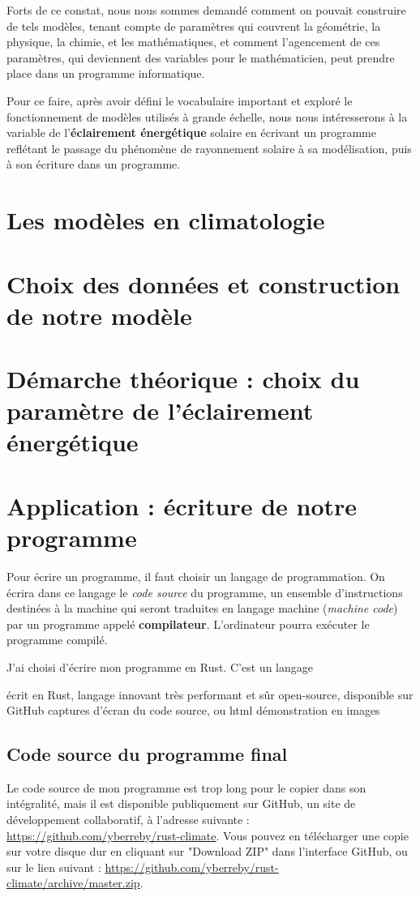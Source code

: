 \documentclass[12pt]{article}
\begin{document}
Forts de ce constat, nous nous sommes demandé comment on pouvait construire de tels modèles, tenant compte de paramètres qui couvrent la géométrie, la physique, la chimie, et les mathématiques, et comment l’agencement de ces paramètres, qui deviennent des variables pour le mathématicien, peut prendre place dans un programme informatique.

Pour ce faire, après avoir défini le vocabulaire important et exploré le fonctionnement de modèles utilisés à grande échelle, nous nous intéresserons à la variable de l'\textbf{éclairement énergétique} solaire en écrivant un programme reflétant le passage du phénomène de rayonnement solaire à sa modélisation, puis à son écriture dans un programme.


\section{Les modèles en climatologie}



\section{Choix des données et construction de notre modèle}

\section{Démarche théorique : choix du paramètre de l'éclairement énergétique}

\section{Application : écriture de notre programme}
Pour écrire un programme, il faut choisir un langage de programmation. On écrira dans ce langage le \textit{code source} du programme, un ensemble d'instructions destinées à la machine qui seront traduites en langage machine (\textit{machine code}) par un programme appelé \textbf{compilateur}. L'ordinateur pourra exécuter le programme compilé.

J'ai choisi d'écrire mon programme en Rust. C'est un langage

écrit en Rust, langage innovant très performant et sûr
open-source, disponible sur GitHub
captures d'écran du code source, ou html
démonstration en images


\subsection{Code source du programme final}
Le code source de mon programme est trop long pour le copier dans son intégralité, mais il est disponible publiquement sur GitHub, un site de développement collaboratif, à l'adresse suivante : \url{https://github.com/yberreby/rust-climate}. Vous pouvez en télécharger une copie sur votre disque dur en cliquant sur "Download ZIP" dans l'interface GitHub, ou sur le lien suivant : \url{https://github.com/yberreby/rust-climate/archive/master.zip}.
\end{document}
